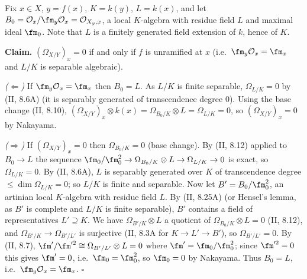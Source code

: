 \documentclass[11pt]{article}
\begin{document}
\pf
Fix $x\in X$, $y=f(x)$, $K=k(y)$, $L=k(x)$, and let $B_0=\mathcal O_x/\fm_y\mathcal O_x=\mathcal O_{X_y,x}$, a local $K$-algebra with residue field $L$ and maximal ideal $\fm_0$. Note that $L$ is a finitely generated field extension of $k$, hence of $K$.

\textbf{Claim.} $(\Omega_{X/Y})_x=0$ if and only if $f$ is unramified at $x$ (i.e.\ $\fm_y\mathcal O_x=\fm_x$ and $L/K$ is separable algebraic).

\emph{($\Leftarrow$)} If $\fm_y\mathcal O_x=\fm_x$ then $B_0=L$. As $L/K$ is finite separable, $\Omega_{L/K}=0$ by (II, 8.6A) (it is separably generated of transcendence degree $0$). Using the base change (II, 8.10), $(\Omega_{X/Y})_x\otimes k(x)=\Omega_{B_0/K}\otimes L=\Omega_{L/K}=0$, so $(\Omega_{X/Y})_x=0$ by Nakayama.

\emph{($\Rightarrow$)} If $(\Omega_{X/Y})_x=0$ then $\Omega_{B_0/K}=0$ (base change). By (II, 8.12) applied to $B_0\to L$ the sequence $\fm_0/\fm_0^2\to\Omega_{B_0/K}\otimes L\to\Omega_{L/K}\to0$ is exact, so $\Omega_{L/K}=0$. By (II, 8.6A), $L$ is separably generated over $K$ of transcendence degree $\le\dim\Omega_{L/K}=0$; so $L/K$ is finite and separable. Now let $B'=B_0/\fm_0^2$, an artinian local $K$-algebra with residue field $L$. By (II, 8.25A) (or Hensel's lemma, as $B'$ is complete and $L/K$ is finite separable), $B'$ contains a field of representatives $L'\supseteq K$. We have $\Omega_{B'/K}\otimes L$ a quotient of $\Omega_{B_0/K}\otimes L=0$ (II, 8.12), and $\Omega_{B'/K}\to\Omega_{B'/L'}$ is surjective (II, 8.3A for $K\to L'\to B'$), so $\Omega_{B'/L'}=0$. By (II, 8.7), $\fm'/\fm'^2\cong\Omega_{B'/L'}\otimes L=0$ where $\fm'=\fm_0/\fm_0^2$; since $\fm'^2=0$ this gives $\fm'=0$, i.e.\ $\fm_0=\fm_0^2$, so $\fm_0=0$ by Nakayama. Thus $B_0=L$, i.e.\ $\fm_y\mathcal O_x=\fm_x$. $\square$
\end{document}
